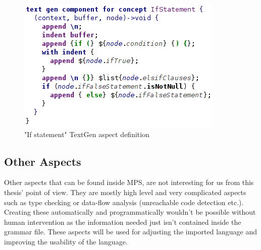 \begin{figure}[h]
	\centering
	\includegraphics[scale=0.70]{./img/if_statement_textgen.png}
	\caption{"If statement" TextGen aspect definition}
	\label{fig:if_statement_textgen}
\end{figure}

\subsection{Other Aspects}
Other aspects that can be found inside MPS, are not interesting for us from this thesis' point of view.
They are mostly high level and very complicated aspects such as type checking or data-flow analysis (unreachable code detection etc.).
Creating these automatically and programmatically wouldn't be possible without human intervention as the information needed just isn't contained inside the grammar file.
These aspects will be used for adjusting the imported language and improving the usability of the language.